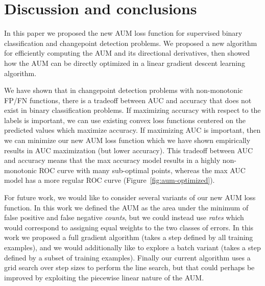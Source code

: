\documentclass{article}
\begin{document}
\section{Discussion and conclusions}
\label{sec:discussion}

In this paper we proposed the new AUM loss function for supervised binary classification and changepoint detection problems.
We proposed a new algorithm for efficiently computing the AUM and its directional derivatives, then showed how the AUM can be directly optimized in a linear gradient descent learning algorithm. 

We have shown that in changepoint detection problems with non-monotonic FP/FN functions, there is a tradeoff between AUC and accuracy that does not exist in binary classification problems.
If maximizing accuracy with respect to the labels is important, we can use existing convex loss functions centered on the predicted values which maximize accuracy.
If maximizing AUC is important, then we can minimize our new AUM loss function which we have shown empirically results in AUC maximization (but lower accuracy).
This tradeoff between AUC and accuracy means that the max accuracy model results in a highly non-monotonic ROC curve with many sub-optimal points, whereas the max AUC model has a more regular ROC curve (Figure~\ref{fig:aum-optimized}).


For future work, we would like to consider several variants of our new AUM loss function.
In this work we defined the AUM as the area under the minimum of false positive and false negative \emph{counts}, but we could instead use \emph{rates} which would correspond to assigning equal weights to the two classes of errors.
In this work we proposed a full gradient algorithm (takes a step defined by all training examples), and we would additionally like to explore a batch variant (takes a step defined by a subset of training examples).
Finally our current algorithm uses a grid search over step sizes to perform the line search, but that could perhaps be improved by exploiting the piecewise linear nature of the AUM.
\end{document}
